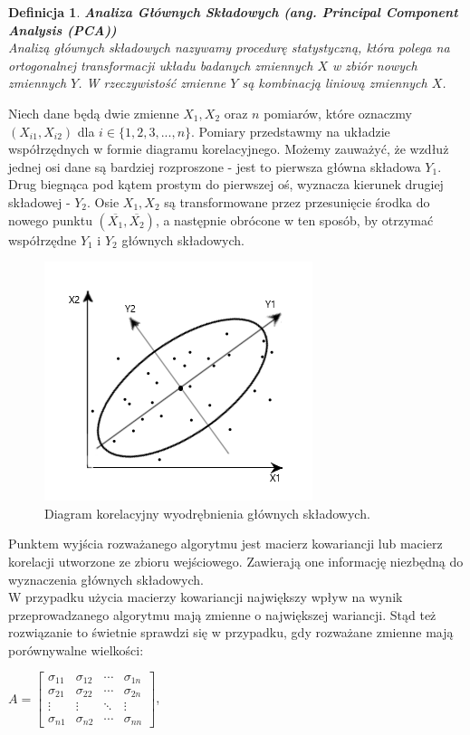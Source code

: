 \documentclass[12pt,a4paper]{report}
\newtheorem{df}{Definicja}
\begin{document}
\begin{df}\textbf{Analiza Głównych Składowych (ang. Principal Component Analysis (PCA))}
\\Analizą głównych składowych nazywamy procedurę statystyczną, która polega na ortogonalnej transformacji układu badanych zmiennych $X$ w zbiór nowych zmiennych $Y$. W rzeczywistość zmienne $Y$ są kombinacją liniową zmiennych $X$.
\end{df}
Niech dane będą dwie zmienne $X_1, X_2$ oraz $n$ pomiarów, które oznaczmy $(X_{i1},X_{i2})$ dla $i \in \{1,2,3,...,n\}$. Pomiary przedstawmy na układzie współrzędnych w formie diagramu korelacyjnego. Możemy zauważyć, że wzdłuż jednej osi dane są bardziej rozproszone - jest to pierwsza główna składowa $Y_1$. Drug biegnąca pod kątem prostym do pierwszej oś, wyznacza kierunek drugiej składowej - $Y_2$. Osie $X_1, X_2$ są transformowane przez przesunięcie środka do nowego punktu $(\overline{X_1},\overline{X_2})$, a następnie obrócone w ten sposób, by otrzymać współrzędne $Y_1$ i $Y_2$ głównych składowych.
\begin{center}
\begin{figure}[H]
\centering
\includegraphics[scale=1]{obrazek.PNG} 
\caption{Diagram korelacyjny wyodrębnienia głównych składowych.}
\end{figure}
\end{center}
Punktem wyjścia rozważanego algorytmu jest macierz kowariancji lub macierz korelacji utworzone ze zbioru wejściowego. Zawierają one informację niezbędną do wyznaczenia głównych składowych.
\\W przypadku użycia macierzy kowariancji największy wpływ na wynik przeprowadzanego algorytmu mają zmienne o największej wariancji. Stąd też rozwiązanie to świetnie sprawdzi się w przypadku, gdy rozważane zmienne mają porównywalne wielkości: 
\begin{center}
$ A= \left[
        \begin{array}{cccc}
         \sigma_{11} & \sigma_{12} & \cdots & \sigma_{1n}\\
         \sigma_{21} & \sigma_{22} & \cdots & \sigma_{2n}\\
         \vdots & \vdots & \ddots & \vdots\\
         \sigma_{n1} & \sigma_{n2} & \cdots & \sigma_{nn}
         \end{array}
      \right]$, 
\end{center}
\end{document}
